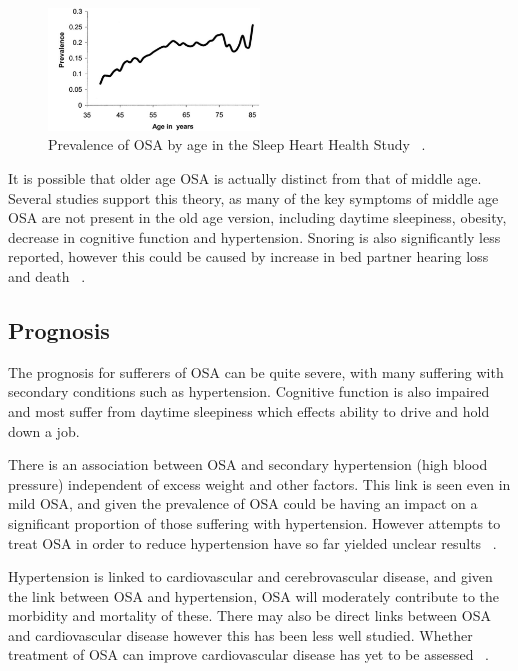 \begin{figure}[h]
\centering 
\includegraphics[width=0.5\textwidth]{drawings/prevalenceage}
\caption{Prevalence of OSA by age in the Sleep Heart Health Study ~\cite{young2002predictors}.}
\label{fig:prevalence}
\end{figure}

It is possible that older age OSA is actually distinct from that of middle age. Several studies support this theory, as many of the key symptoms of middle age OSA are not present in the old age version, including daytime sleepiness, obesity, decrease in cognitive function and hypertension. Snoring is also significantly less reported, however this could be caused by increase in bed partner hearing loss and death ~\cite{enright1996prevalence,young1996sleep}.

\subsection{Prognosis}
The prognosis for sufferers of OSA can be quite severe, with many suffering with secondary conditions such as hypertension. Cognitive function is also impaired and most suffer from daytime sleepiness which effects ability to drive and hold down a job.

There is an association between OSA and secondary hypertension (high blood pressure) independent of excess weight and other factors. This link is seen even in mild OSA, and given the prevalence of OSA could be having an impact on a significant proportion of those suffering with hypertension. However attempts to treat OSA in order to reduce hypertension have so far yielded unclear results ~\cite{pankow2000sleep}.

Hypertension is linked to cardiovascular and cerebrovascular disease, and given the link between OSA and hypertension, OSA will moderately contribute to the morbidity and mortality of these. There may also be direct links between OSA and cardiovascular disease however this has been less well studied. Whether treatment of OSA can improve cardiovascular disease has yet to be assessed ~\cite{he1988mortality}.

